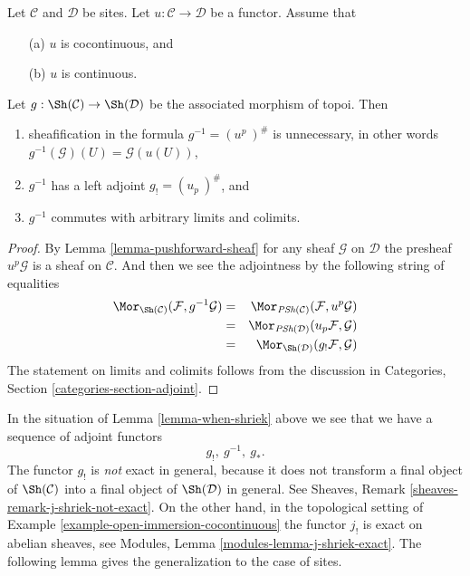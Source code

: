 \begin{lemma}
\label{lemma-when-shriek}
Let $\mathcal{C}$ and $\mathcal{D}$ be sites.
Let $u : \mathcal{C} \to \mathcal{D}$ be a functor.
Assume that
\begin{enumerate}
\item[(a)] $u$ is cocontinuous, and
\item[(b)] $u$ is continuous.
\end{enumerate}
Let $g : \Sh(\mathcal{C}) \to \Sh(\mathcal{D})$
be the associated morphism of topoi. Then
\begin{enumerate}
\item sheafification in the formula $g^{-1} = (u^p\ )^\#$ is
unnecessary, in other words $g^{-1}(\mathcal{G})(U) = \mathcal{G}(u(U))$,
\item $g^{-1}$ has a left adjoint $g_{!} = (u_p\ )^\#$, and
\item $g^{-1}$ commutes with arbitrary limits and colimits.
\end{enumerate}
\end{lemma}

\begin{proof}
By Lemma \ref{lemma-pushforward-sheaf} for any sheaf $\mathcal{G}$
on $\mathcal{D}$ the presheaf $u^p\mathcal{G}$ is a sheaf on $\mathcal{C}$.
And then we see the adjointness by the following string of
equalities
\begin{eqnarray*}
\Mor_{\Sh(\mathcal{C})}(\mathcal{F}, g^{-1}\mathcal{G})
& = &
\Mor_{\textit{PSh}(\mathcal{C})}(\mathcal{F}, u^p\mathcal{G})
\\
& = &
\Mor_{\textit{PSh}(\mathcal{D})}(u_p\mathcal{F}, \mathcal{G})
\\
& = &
\Mor_{\Sh(\mathcal{D})}(g_{!}\mathcal{F}, \mathcal{G})
\end{eqnarray*}
The statement on limits and colimits follows from the
discussion in Categories, Section \ref{categories-section-adjoint}.
\end{proof}

\noindent
In the situation of Lemma \ref{lemma-when-shriek} above we see that we have
a sequence of adjoint functors
$$
g_{!}, \ g^{-1}, \ g_*.
$$
The functor $g_!$ is {\it not} exact in general, because it does
not transform a final object of $\Sh(\mathcal{C})$
into a final object of $\Sh(\mathcal{D})$ in general.
See Sheaves, Remark \ref{sheaves-remark-j-shriek-not-exact}.
On the other hand, in the topological setting of
Example \ref{example-open-immersion-cocontinuous} the functor
$j_!$ is exact on abelian sheaves, see
Modules, Lemma \ref{modules-lemma-j-shriek-exact}. The following lemma gives
the generalization to the case of sites.


